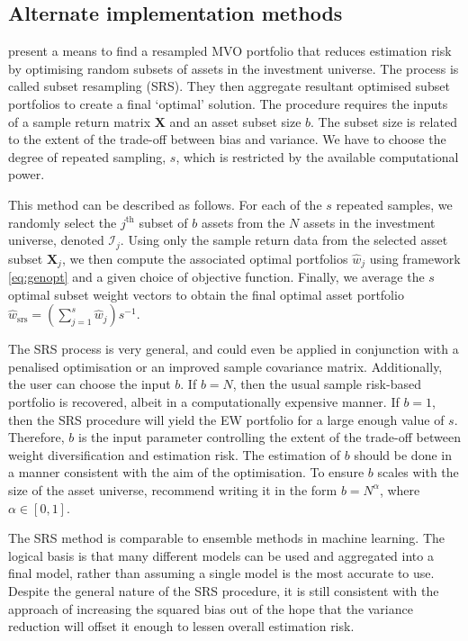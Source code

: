 \documentclass[
]{article}
\begin{document}
\hypertarget{alternate-implementation-methods}{%
\subsection{Alternate implementation methods}\label{alternate-implementation-methods}}

\citet{SW17} present a means to find a resampled MVO portfolio that reduces estimation risk by optimising
random subsets of assets in the investment universe. The process is called subset resampling (SRS).
They then aggregate resultant optimised subset portfolios to create a final `optimal' solution. The
procedure requires the inputs of a sample return matrix \(\textbf{X}\) and an asset subset size \(b\).
The subset size is related to the extent of the trade-off between bias and variance. We have to
choose the degree of repeated sampling, \(s\), which is restricted by the available computational
power.

This method can be described as follows. For each of the \(s\) repeated samples, we randomly select
the \(j^{\text{th}}\) subset of \(b\) assets from the \(N\) assets in the investment universe, denoted
\(\mathcal{I}_j\). Using only the sample return data from the selected asset subset \(\textbf{X}_j\), we
then compute the associated optimal portfolios \(\hat{w}_j\) using framework \eqref{eq:genopt} and a
given choice of objective function. Finally, we average the \(s\) optimal subset weight vectors to
obtain the final optimal asset portfolio \(\hat{w}_\mathrm{srs} = (\sum_{j = 1}^s \hat{w}_j)s^{-1}\).

The SRS process is very general, and could even be applied in conjunction with a penalised
optimisation or an improved sample covariance matrix. Additionally, the user can choose the input
\(b\). If \(b = N\), then the usual sample risk-based portfolio is recovered, albeit in a
computationally expensive manner. If \(b = 1\), then the SRS procedure will yield the EW portfolio for
a large enough value of \(s\). Therefore, \(b\) is the input parameter controlling the extent of the
trade-off between weight diversification and estimation risk. The estimation of \(b\) should be done
in a manner consistent with the aim of the optimisation. To ensure \(b\) scales with the size of the
asset universe, \citet{SW17} recommend writing it in the form \(b = N^{\alpha}\), where \(\alpha \in [0, 1]\).

The SRS method is comparable to ensemble methods in machine learning. The logical basis is that many
different models can be used and aggregated into a final model, rather than assuming a single model
is the most accurate to use. Despite the general nature of the SRS procedure, it is still consistent
with the approach of increasing the squared bias out of the hope that the variance reduction will
offset it enough to lessen overall estimation risk.
\end{document}
